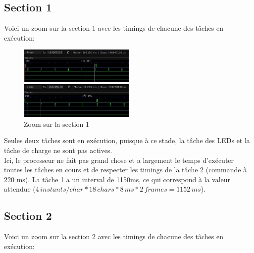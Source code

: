 \documentclass[11pt, a4paper]{article}
\begin{document}
\subsection{Section 1}

Voici un zoom sur la section 1 avec les timings de chacune des tâches en exécution:

\begin{figure}[H]
    \begin{multicols}{2}
        \begin{center}
            \includegraphics[width=0.5\textwidth]{section1_empty_t1_light}
        \end{center}
        \columnbreak
        \begin{center}
            \includegraphics[width=0.5\textwidth]{section1_empty_t2_cmd}
        \end{center}
    \end{multicols}
    \caption{Zoom sur la section 1}
    \label{Zoom sur la section 1}
\end{figure}

Seules deux tâches sont en exécution, puisque à ce stade, la tâche des LEDs et la tâche de charge ne sont pas actives. \\

Ici, le processeur ne fait pas grand chose et a largement le temps d'exécuter toutes les tâches en cours et
de respecter les timings de la tâche 2 (commande à 220 ms). La tâche 1 a un interval de 1150ms,
ce qui correspond à la valeur attendue ($4 \,instants/char * 18 \,chars * 8 \,ms*2 \,frames=1152\,ms$).

\subsection{Section 2}

Voici un zoom sur la section 2 avec les timings de chacune des tâches en exécution:
\end{document}
